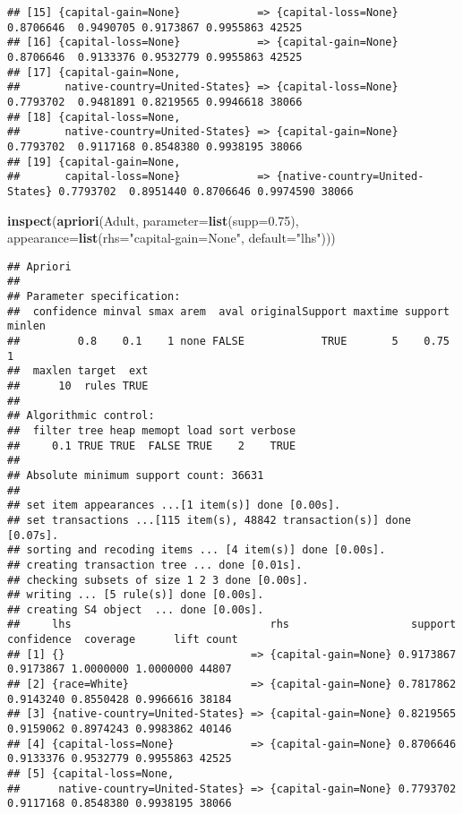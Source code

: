 \documentclass[
]{article}
\newenvironment{Shaded}{\begin{snugshade}}{\end{snugshade}}
\newcommand{\AttributeTok}[1]{\textcolor[rgb]{0.13,0.29,0.53}{#1}}
\newcommand{\FloatTok}[1]{\textcolor[rgb]{0.00,0.00,0.81}{#1}}
\newcommand{\FunctionTok}[1]{\textcolor[rgb]{0.13,0.29,0.53}{\textbf{#1}}}
\newcommand{\NormalTok}[1]{#1}
\newcommand{\StringTok}[1]{\textcolor[rgb]{0.31,0.60,0.02}{#1}}
\begin{document}
\begin{verbatim}
## [15] {capital-gain=None}            => {capital-loss=None}            0.8706646  0.9490705 0.9173867 0.9955863 42525
## [16] {capital-loss=None}            => {capital-gain=None}            0.8706646  0.9133376 0.9532779 0.9955863 42525
## [17] {capital-gain=None,                                                                                            
##       native-country=United-States} => {capital-loss=None}            0.7793702  0.9481891 0.8219565 0.9946618 38066
## [18] {capital-loss=None,                                                                                            
##       native-country=United-States} => {capital-gain=None}            0.7793702  0.9117168 0.8548380 0.9938195 38066
## [19] {capital-gain=None,                                                                                            
##       capital-loss=None}            => {native-country=United-States} 0.7793702  0.8951440 0.8706646 0.9974590 38066
\end{verbatim}

\begin{Shaded}
\begin{Highlighting}[]
\FunctionTok{inspect}\NormalTok{(}\FunctionTok{apriori}\NormalTok{(Adult, }\AttributeTok{parameter=}\FunctionTok{list}\NormalTok{(}\AttributeTok{supp=}\FloatTok{0.75}\NormalTok{), }\AttributeTok{appearance=}\FunctionTok{list}\NormalTok{(}\AttributeTok{rhs=}\StringTok{"capital{-}gain=None"}\NormalTok{, }\AttributeTok{default=}\StringTok{"lhs"}\NormalTok{)))}
\end{Highlighting}
\end{Shaded}

\begin{verbatim}
## Apriori
## 
## Parameter specification:
##  confidence minval smax arem  aval originalSupport maxtime support minlen
##         0.8    0.1    1 none FALSE            TRUE       5    0.75      1
##  maxlen target  ext
##      10  rules TRUE
## 
## Algorithmic control:
##  filter tree heap memopt load sort verbose
##     0.1 TRUE TRUE  FALSE TRUE    2    TRUE
## 
## Absolute minimum support count: 36631 
## 
## set item appearances ...[1 item(s)] done [0.00s].
## set transactions ...[115 item(s), 48842 transaction(s)] done [0.07s].
## sorting and recoding items ... [4 item(s)] done [0.00s].
## creating transaction tree ... done [0.01s].
## checking subsets of size 1 2 3 done [0.00s].
## writing ... [5 rule(s)] done [0.00s].
## creating S4 object  ... done [0.00s].
##     lhs                               rhs                   support confidence  coverage      lift count
## [1] {}                             => {capital-gain=None} 0.9173867  0.9173867 1.0000000 1.0000000 44807
## [2] {race=White}                   => {capital-gain=None} 0.7817862  0.9143240 0.8550428 0.9966616 38184
## [3] {native-country=United-States} => {capital-gain=None} 0.8219565  0.9159062 0.8974243 0.9983862 40146
## [4] {capital-loss=None}            => {capital-gain=None} 0.8706646  0.9133376 0.9532779 0.9955863 42525
## [5] {capital-loss=None,                                                                                 
##      native-country=United-States} => {capital-gain=None} 0.7793702  0.9117168 0.8548380 0.9938195 38066
\end{verbatim}
\end{document}
